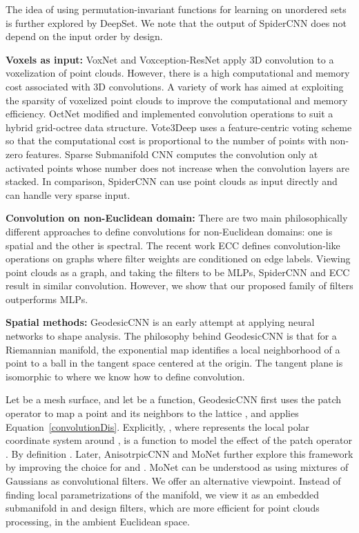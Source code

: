 \documentclass[runningheads]{llncs}
\begin{document}
The idea of using permutation-invariant functions for learning on unordered sets is further explored by DeepSet\cite{zaheer2017deep}. We note that the output of SpiderCNN does not depend on the input order by design.

{\noindent \bf Voxels as input:}
VoxNet \cite{maturana2015voxnet} and Voxception-ResNet \cite{brock2016generative} apply 3D convolution to a voxelization of point clouds. However, there is a high computational and memory cost associated with 3D convolutions. A variety of work \cite{riegler2017octnet}  \cite{engelcke2017vote3deep}  \cite{graham20173d} has aimed at exploiting the sparsity of voxelized point clouds to improve the computational and memory efficiency.
OctNet \cite{riegler2017octnet} modified and implemented convolution operations to suit a hybrid grid-octree data structure.
Vote3Deep \cite{engelcke2017vote3deep} uses a feature-centric voting scheme so that the computational cost is proportional to the number of points with non-zero features.
Sparse Submanifold CNN \cite{graham20173d} computes the convolution only at activated points whose number does not increase when the convolution layers are stacked. In comparison, SpiderCNN can use point clouds as input directly and can handle very sparse input. 

{\noindent \bf Convolution on non-Euclidean domain:}
There are two main philosophically different approaches to define convolutions for non-Euclidean domains: one is spatial and the other is spectral. The recent work ECC \cite{simonovsky2017dynamic} defines convolution-like operations on graphs where filter weights are conditioned on edge labels. Viewing point clouds as a graph, and taking the filters to be MLPs, SpiderCNN and ECC\cite{simonovsky2017dynamic} result in similar convolution. However, we show that our proposed family of filters outperforms MLPs.  

{\noindent \bf Spatial methods:}
GeodesicCNN \cite{masci2015geodesic} is an early attempt at applying neural networks to shape analysis. The philosophy behind GeodesicCNN is that for a Riemannian manifold, the exponential map identifies a local neighborhood of a point to a ball in the tangent space centered at the origin. The tangent plane is isomorphic to  where we know how to define convolution. 

Let  be a mesh surface, and let  be a function, GeodesicCNN first uses the patch operator 
to map a point  and its neighbors  to the lattice , and applies Equation~\ref{convolutionDis}. Explicitly, 
,
where  represents the local polar coordinate system around ,  is a function to model the effect of the patch operator . By definition .
Later, AnisotrpicCNN \cite{boscaini2016learning} and MoNet \cite{monti2017geometric} further explore this framework by improving the choice for  and . MoNet \cite{monti2017geometric} can be understood as using mixtures of Gaussians as convolutional filters. We offer an alternative viewpoint. Instead of finding local parametrizations of the manifold, we view it as an embedded submanifold in  and design filters, which are more efficient for point clouds processing, in the ambient Euclidean space.
\end{document}
